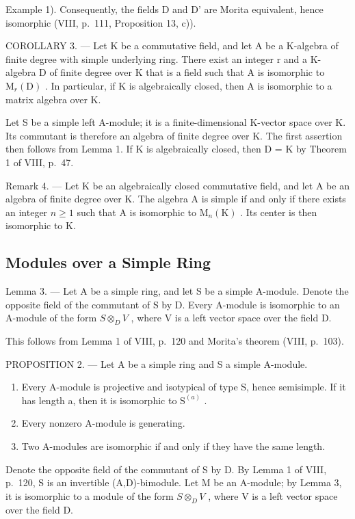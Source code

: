 Example 1). Consequently, the fields D and D' are Morita equivalent, hence isomorphic (VIII, p.~111, Proposition 13, c)).

COROLLARY 3. --- Let K be a commutative field, and let A be a K-algebra of finite degree with simple underlying ring. There exist an integer r and a K-algebra D of finite degree over K that is a field such that A is isomorphic to \(\mathrm{M}_{r}(\mathrm{D})\) . In particular, if K is algebraically closed, then A is isomorphic to a matrix algebra over K.

Let S be a simple left A-module; it is a finite-dimensional K-vector space over K. Its commutant is therefore an algebra of finite degree over K. The first assertion then follows from Lemma 1. If K is algebraically closed, then D = K by Theorem 1 of VIII, p.~47.

Remark 4. --- Let K be an algebraically closed commutative field, and let A be an algebra of finite degree over K. The algebra A is simple if and only if there exists an integer \(n \geqslant 1\) such that A is isomorphic to \(\mathrm{M}_{n}(\mathrm{K})\) . Its center is then isomorphic to K.

\subsection{Modules over a Simple Ring}

Lemma 3. --- Let A be a simple ring, and let S be a simple A-module. Denote the opposite field of the commutant of S by D. Every A-module is isomorphic to an A-module of the form \(S \otimes_{D} V\) , where V is a left vector space over the field D.

This follows from Lemma 1 of VIII, p.~120 and Morita's theorem (VIII, p.~103).

PROPOSITION 2. --- Let A be a simple ring and S a simple A-module.

\begin{enumerate}
\def\labelenumi{\alph{enumi})}
\item
  Every A-module is projective and isotypical of type S, hence semisimple. If it has length a, then it is isomorphic to \(\mathrm{S}^{(a)}\) .
\item
  Every nonzero A-module is generating.
\item
  Two A-modules are isomorphic if and only if they have the same length.
\end{enumerate}

Denote the opposite field of the commutant of S by D. By Lemma 1 of VIII, p.~120, S is an invertible (A,D)-bimodule. Let M be an A-module; by Lemma 3, it is isomorphic to a module of the form \(S \otimes_{D} V\) , where V is a left vector space over the field D.

